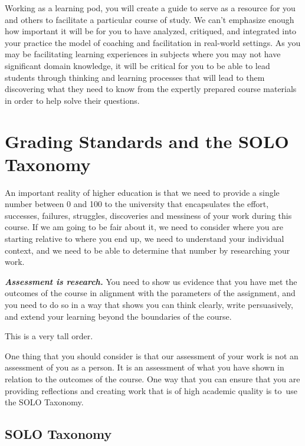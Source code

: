 \documentclass[
]{book}
\begin{document}
Working as a learning pod, you will create a guide to serve as a resource for you and others to facilitate a particular course of study. We can't emphasize enough how important it will be for you to have analyzed, critiqued, and integrated into your practice the model of coaching and facilitation in real-world settings. As you may be facilitating learning experiences in subjects where you may not have significant domain knowledge, it will be critical for you to be able to lead students through thinking and learning processes that will lead to them discovering what they need to know from the expertly prepared course materials in order to help solve their questions.

\hypertarget{grading-standards-and-the-solo-taxonomy}{%
\section*{Grading Standards and the SOLO Taxonomy}\label{grading-standards-and-the-solo-taxonomy}}

An important reality of higher education is that we need to provide a single number between 0 and 100 to the university that encapsulates the effort, successes, failures, struggles, discoveries and messiness of your work during this course. If we am going to be fair about it, we need to consider where you are starting relative to where you end up, we need to understand your individual context, and we need to be able to determine that number by researching your work.

\textbf{\emph{Assessment is research.}} You need to show us evidence that you have met the outcomes of the course in alignment with the parameters of the assignment, and you need to do so in a way that shows you can think clearly, write persuasively, and extend your learning beyond the boundaries of the course.

This is a very tall order.

One thing that you should consider is that our assessment of your work is not an assessment of you as a person. It is an assessment of what you have shown in relation to the outcomes of the course. One way that you can ensure that you are providing reflections and creating work that is of high academic quality is to~use the SOLO Taxonomy.

\hypertarget{solo-taxonomy}{%
\subsection*{SOLO Taxonomy}\label{solo-taxonomy}}
\end{document}
